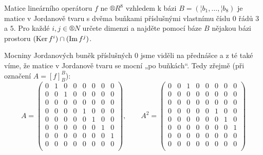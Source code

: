 \documentclass[10pt]{article}                   %
\begin{document}
\begin{priklad}[7.1]
    Matice lineárního operátoru $f$ ne $®R^8$ vzhledem k bázi $B = (¦b_1, …, ¦b_8)$ je matice v Jordanově tvaru s dvěma buňkami příslušnými vlastnímu číslu $0$ řádů $3$ a $5$. Pro každé $i, j \in ®N$ určete dimenzi a najděte pomocí báze $B$ nějakou bázi prostoru $(\operatorname{Ker} f^i) \cap (\operatorname{Im} f^j)$.

    \begin{reseni}
        Mocniny Jordanových buněk příslušných 0 jsme viděli na přednášce a z té také víme, že matice v Jordanově tvaru se mocní „po buňkách“. Tedy zřejmě (při označení $A = [f]_B^B$):
        $$ A = \begin{pmatrix} 0 & 1 & 0 & 0 & 0 & 0 & 0 & 0 \\ 0 & 0 & 1 & 0 & 0 & 0 & 0 & 0 \\ 0 & 0 & 0 & 0 & 0 & 0 & 0 & 0 \\ 0 & 0 & 0 & 0 & 1 & 0 & 0 & 0 \\ 0 & 0 & 0 & 0 & 0 & 1 & 0 & 0 \\ 0 & 0 & 0 & 0 & 0 & 0 & 1 & 0 \\ 0 & 0 & 0 & 0 & 0 & 0 & 0 & 1 \\ 0 & 0 & 0 & 0 & 0 & 0 & 0 & 0 \\ \end{pmatrix},\qquad A^2 = \begin{pmatrix} 0 & 0 & 1 & 0 & 0 & 0 & 0 & 0 \\ 0 & 0 & 0 & 0 & 0 & 0 & 0 & 0 \\ 0 & 0 & 0 & 0 & 0 & 0 & 0 & 0 \\ 0 & 0 & 0 & 0 & 0 & 1 & 0 & 0 \\ 0 & 0 & 0 & 0 & 0 & 0 & 1 & 0 \\ 0 & 0 & 0 & 0 & 0 & 0 & 0 & 1 \\ 0 & 0 & 0 & 0 & 0 & 0 & 0 & 0 \\ 0 & 0 & 0 & 0 & 0 & 0 & 0 & 0 \\ \end{pmatrix} $$

\end{reseni}
\end{priklad}
\end{document}
